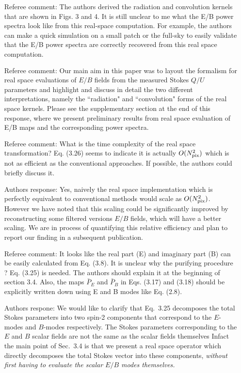 \documentclass[12pt]{article}
\begin{document}
\begin{itemize}
\item[{Referee comment: }] The authors derived the radiation and convolution kernels that are shown in Figs. 3 and 4. It is still unclear to me what the E/B power spectra look like from this real-space computation. For example, the authors can make a quick simulation on a small patch or the full-sky to easily validate that the E/B power spectra are correctly recovered from this real space computation.

\item[{Referee comment: }]  Our main aim in this paper was to layout the formalism for real space evaluations of $E/B$ fields from the measured Stokes $Q/U$ parameters and highlight and discuss in detail the two different interpretations, namely the ``radiation" and ``convolution" forms of the real space kernels. Please see the supplementary section at the end of this response, where we present preliminary results from real space evaluation of E/B maps and the corresponding power spectra.\\

\item[{Referee comment:}] What is the time complexity of the real space transformation? Eq. (3.26) seems to indicate it is actually $O(N_{\rm pix}^2 )$ which is not as efficient as the conventional approaches. If possible, the authors could briefly discuss it.

\item[{Authors response:}] Yes, naively the real space implementation which is perfectly equivalent to conventional methods would scale as $O(N_{\rm pix}^2 )$. However we have noted that this scaling could be significantly improved by reconstructing some filtered versions $E/B$ fields, which will have a better scaling. We are in process of quantifying this relative efficiency and plan to report our finding in a subsequent publication.

\item[{Referee comment: }]It looks like the real part (E) and imaginary part (B) can be easily calculated from Eq. (3.8). It is unclear why the purifying procedure ? Eq. (3.25) is needed. The authors should explain it at the beginning of section 3.4. Also, the maps $\bar P_E$ and $\bar P_B$ in Eqs. (3.17) and (3.18) should be explicitly written down using E and B modes like Eq. (2.8).

\item[{Authors respone: }] We would like to clarify that Eq.~3.25 decomposes the total Stokes parameters into two spin-2 components that correspond to the $E$-modes and $B$-modes respectively. The Stokes parameters corresponding to the $E$ and $B$ scalar fields are not the same as the scalar fields themselves  Infact the main point of Sec.~3.4 is that we present a real space operator which directly decomposes the total Stokes vector into these components, \emph{without first having to evaluate the scalar $E/B$ modes themselves.} 


\end{itemize}
\end{document}
